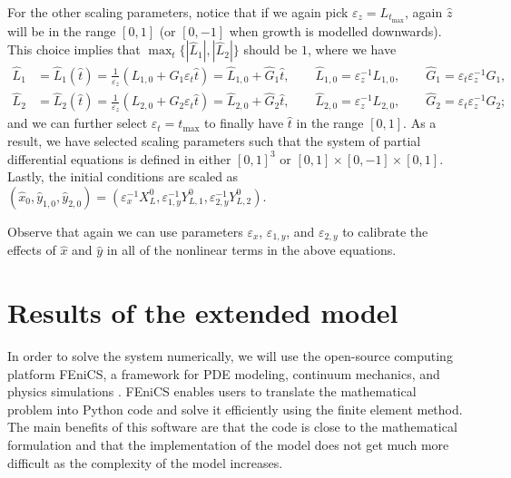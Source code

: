 \documentclass[11pt]{article}
\numberwithin{equation}{section}
\begin{document}
For the other scaling parameters, notice that if we again pick \( \varepsilon_z = L_{t_{\max}}\), again \(\hat z \) will be in the range \( [0,1]\) (or \([0,-1]\) when growth is modelled downwards). 
This choice implies that \( \max_t\{|\hat{L}_1|,|\hat{L}_2|\}\) should be \(1\), where we have
\begin{align}
    \hat{L}_1 &= \hat{L}_1(\hat t) = \frac{1}{\varepsilon_z} ( L_{1,0} + G_1 \varepsilon_t \hat t )
    = \hat{L}_{1,0} + \hat{G}_1 \hat t,
    \qquad 
    \hat{L}_{1,0} = \varepsilon^{-1}_z L_{1,0},
    \qquad
    \hat{G}_1 = \varepsilon_t \varepsilon_z^{-1} G_1,
    \\
    \hat{L}_2 &= \hat{L}_2(\hat t) = \frac{1}{\varepsilon_z} ( L_{2,0} + G_2 \varepsilon_t \hat t )
    = \hat{L}_{2,0} + \hat{G}_2 \hat t,
    \qquad 
    \hat{L}_{2,0} = \varepsilon^{-1}_z L_{2,0},
    \qquad
    \hat{G}_2 = \varepsilon_t \varepsilon_z^{-1} G_2;
\end{align}
and we can further select \( \varepsilon_t = t_{\max}\) to finally have \( \hat t\) in the range \( [0,1]\). As a result, we have selected scaling parameters such that the system of partial differential equations is defined in either \( [0,1]^3\) or \([0,1]\times [0,-1] \times [0,1]\).
%
Lastly, the initial conditions are scaled as \( (\hat{x}_0,\hat{y}_{1,0},\hat{y}_{2,0} ) = (\varepsilon_x^{-1} X^0_L, \varepsilon_{1,y}^{-1} Y^0_{L,1}, \varepsilon_{2,y}^{-1} Y^0_{L,2}) \). 


Observe that again we can use parameters \(\varepsilon_x\), \(\varepsilon_{1,y}\), and \(\varepsilon_{2,y}\) to calibrate the effects of \( \hat{x}\) and \(\hat{y}\) in all of the nonlinear terms in the above equations.

\newpage

\section{Results of the extended model}
\label{sec:Results_Extension}


In order to solve the system numerically, we will use the open-source computing platform FEniCS, a framework for PDE modeling, continuum mechanics, and physics simulations \cite{fenics}. FEniCS enables users to translate the mathematical problem into Python code and solve it efficiently using the finite element method. The main benefits of this software are that the code is close to the mathematical formulation and that the implementation of the model does not get much more difficult as the complexity of the model increases.
\end{document}
